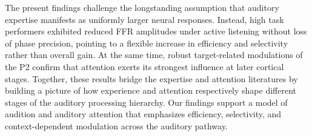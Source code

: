 \documentclass{article}
\begin{document}
The present findings challenge the longstanding assumption that auditory expertise manifests as uniformly larger neural responses. Instead, high task performers exhibited reduced FFR amplitudes under active listening without loss of phase precision, pointing to a flexible increase in efficiency and selectivity rather than overall gain. At the same time, robust target-related modulations of the P2 confirm that attention exerts its strongest influence at later cortical stages. Together, these results bridge the expertise and attention literatures by building a picture of how experience and attention respectively shape different stages of the auditory processing hierarchy. Our findings support a model of audition and auditory attention that emphasizes efficiency, selectivity, and context-dependent modulation across the auditory pathway.

\printbibliography
\end{document}
